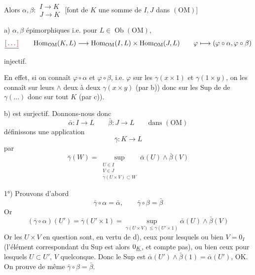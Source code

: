 \documentclass[11pt,a4paper]{article}
\begin{document}
Alors $\alpha, \beta : \begin{array}{l} I \to K \\ J \to K \end{array}$ [font de $K$ une somme de $I, J$ dans $(\mathrm{OM})$]

a) $\alpha, \beta$ épimorphiques i.e. pour $L \in \operatorname{Ob}(\mathrm{OM})$,
\[
  \struck{\ill{}} \qquad \operatorname{Hom}_{\mathrm{OM}}(K, L) \longrightarrow \operatorname{Hom}_{\mathrm{OM}}(I, L) \times \operatorname{Hom}_{\mathrm{OM}}(J, L) \qquad \varphi \longmapsto (\varphi \circ \alpha, \varphi \circ \beta)
\]
injectif.

En effet, si on connaît $\varphi \circ \alpha$ et $\varphi \circ \beta$, i.e. $\varphi$ sur les $\gamma(x \times 1)$ et $\gamma(1 \times y)$, on les connaît sur leurs $\wedge$ deux à deux $\gamma(x \times y)$ (par b)) donc sur les Sup de  de  $\gamma(\ldots)$ donc sur tout $K$ (par c)).

b)  est surjectif. Donnons-nous donc
\[
  \bar\alpha : I \longrightarrow L \qquad \bar\beta : J \longrightarrow L \qquad \text{dans } (\mathrm{OM})
\]
définissons une application
\[
  \bar\gamma : K \longrightarrow L
\]
par
\[
  \bar\gamma(W) = \sup_{\substack{U \in I \\ V \in J \\ \gamma(U \times V) \subset W}} \bar\alpha(U) \wedge \bar\beta(V)
\]

1°) Prouvons d'abord
\[
  \bar\gamma \circ \alpha = \bar\alpha , \qquad \bar\gamma \circ \beta = \bar\beta
\]
Or
\[
  (\bar\gamma \circ \alpha)(U') = \bar\gamma(U' \times 1) = \sup_{\gamma(U \times V) \leq \gamma(U' \times 1)} \bar\alpha(U) \wedge \bar\beta(V)
\]
Or les $U \times V$ en question sont, en vertu de d), ceux pour lesquels ou bien $V = 0_I$ (l'élément correspondant du Sup est alors $0_{\uncertain{K}}$, et  compte pas), ou bien ceux pour lesquels $U \subset U'$, $V$ quelconque. Donc le Sup est $\bar\alpha(U') \wedge \bar\beta(1) = \bar\alpha(U')$, OK. On prouve de même $\bar\gamma \circ \beta = \bar\beta$.
\end{document}
